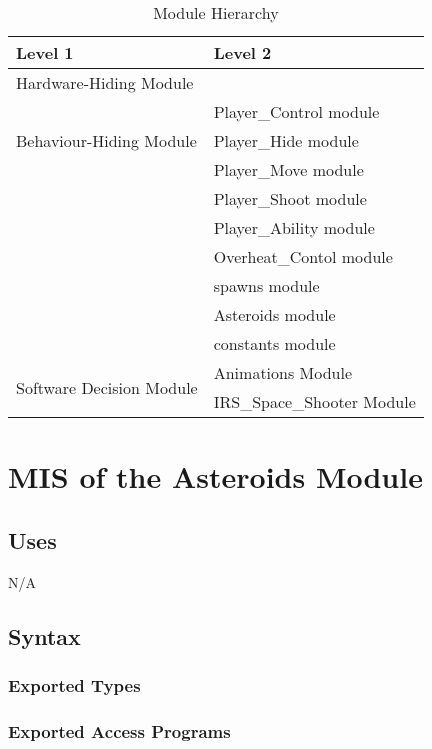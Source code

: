 \documentclass[12pt, titlepage]{article}
\begin{document}
\begin{table}[h!]
\centering
\begin{tabular}{p{} p{}}
\toprule
\textbf{Level 1} & \textbf{Level 2}\\
\midrule

{Hardware-Hiding Module} & ~ \\
\midrule

\multirow{3}{0.3\textwidth}{Behaviour-Hiding Module} 
& Player\_Control module\\
& Player\_Hide module\\
& Player\_Move module\\
& Player\_Shoot module\\
& Player\_Ability module\\
& Overheat\_Contol module\\
& spawns module \\
& Asteroids module\\
& constants module\\
\midrule

\multirow{2}{0.3\textwidth}{Software Decision Module} 
& Animations Module\\
& IRS\_Space\_Shooter Module\\
\bottomrule

\end{tabular}
\caption{Module Hierarchy}
\label{TblMH}
\end{table}


\section {MIS of the Asteroids Module}

\subsection {Uses}

N/A

\subsection {Syntax}

\subsubsection {Exported Types}

\subsubsection {Exported Access Programs}
\end{document}
